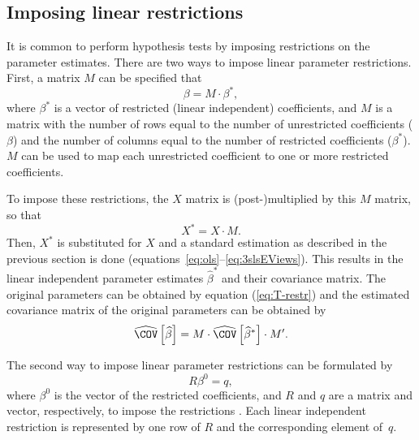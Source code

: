 \subsection{Imposing linear restrictions}\label{sec:Restrictions}

It is common to perform hypothesis tests by imposing restrictions on
the parameter estimates.
There are two ways to impose linear parameter restrictions.
First, a matrix $M$ can be specified that
\begin{equation}
   \beta = M \cdot \beta^* \label{eq:T-restr} ,
\end{equation}
where $\beta^*$ is a vector of restricted (linear independent) coefficients,
and $M$ is a matrix with the number of rows equal to the number of
unrestricted coefficients ($\beta$) and
the number of columns equal to the number of restricted coefficients
($\beta^*$).
$M$ can be used to map each unrestricted coefficient to one or more
restricted coefficients.

To impose these restrictions, the $X$ matrix is
(post-)\hspace{0pt}multiplied by this $M$ matrix, so that
\begin{equation}
    X^* = X \cdot M .
\end{equation}
Then, $X^*$ is substituted for $X$ and a standard estimation as described
in the previous section is done
(equations~\ref{eq:ols}--\ref{eq:3slsEViews}).
This results in the linear independent parameter estimates $\widehat{\beta}^*$ and
their covariance matrix.
The original parameters can be obtained by equation (\ref{eq:T-restr})
and the estimated covariance matrix of the original parameters
can be obtained by
\begin{equation}
   \COVHat \left[ \widehat{\beta} \right]
   = M \cdot \COVHat \left[ \widehat{\beta}^* \right] \cdot M' .
\end{equation}

The second way to impose linear parameter restrictions
can be formulated by
\begin{equation}
   R \beta^0 = q ,
\end{equation}
where $\beta^0$ is the vector of the restricted coefficients, 
and $R$ and $q$ are a matrix and vector, respectively,
to impose the restrictions \citep[see][p.\ 100]{greene03}.
Each linear independent restriction is represented by one row of $R$
and the corresponding element of~$q$.

